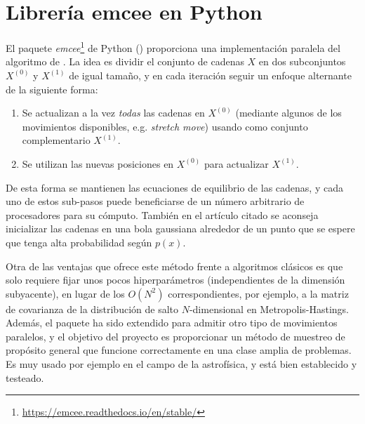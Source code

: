\documentclass[
  a4paper,
	fontsize=11pt, %
	twoside=false, %
  secnumdepth=2,
	numbers=noenddot, %
]{kaohandt}
\begin{document}
\section{Librería emcee en Python}

El paquete \textit{emcee}\footnote[2]{\url{https://emcee.readthedocs.io/en/stable/}} de Python () proporciona una implementación paralela del algoritmo de \textcite{goodman2010ensemble}. La idea es dividir el conjunto de cadenas \(X\) en dos subconjuntos \(X^{(0)}\) y \(X^{(1)}\) de igual tamaño, y en cada iteración seguir un enfoque alternante de la siguiente forma:
\begin{enumerate}
  \item Se actualizan a la vez \textit{todas} las cadenas en \(X^{(0)}\) (mediante algunos de los movimientos disponibles, e.g. \textit{stretch move}) usando como conjunto complementario \(X^{(1)}\).
  \item Se utilizan las nuevas posiciones en \(X^{(0)}\) para actualizar \(X^{(1)}\).
\end{enumerate}
De esta forma se mantienen las ecuaciones de equilibrio de las cadenas, y cada uno de estos sub-pasos puede beneficiarse de un número arbitrario de procesadores para su cómputo. También en el artículo citado se aconseja inicializar las cadenas en una bola gaussiana alrededor de un punto que se espere que tenga alta probabilidad según \(p(x)\).

Otra de las ventajas que ofrece este método frente a algoritmos clásicos es que solo requiere fijar unos pocos hiperparámetros (independientes de la dimensión subyacente), en lugar de los \(O(N^2)\) correspondientes, por ejemplo, a la matriz de covarianza de la distribución de salto \(N\)-dimensional en Metropolis-Hastings. Además, el paquete ha sido extendido para admitir otro tipo de movimientos paralelos, y el objetivo del proyecto es proporcionar un método de muestreo de propósito general que funcione correctamente en una clase amplia de problemas. Es muy usado por ejemplo en el campo de la astrofísica, y está bien establecido y testeado.

\printbibliography[title=Referencias]
\end{document}
